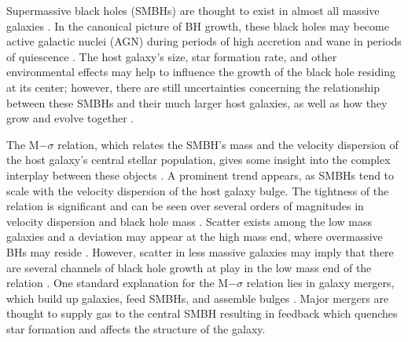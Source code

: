 \documentclass[]{emulateapj}
\begin{document}
Supermassive black holes (SMBHs) are thought to exist in almost all massive galaxies \citep[see][for a review]{Kormendy2013}. In the canonical picture of BH growth, these black holes may become active galactic nuclei (AGN) during periods of high accretion and wane in periods of quiescence \citep{Alexander2005,Papovich2006,Volonteri2012}. The host galaxy's size, star formation rate, and other environmental effects may help to influence the growth of the black hole residing at its center; however, there are still uncertainties concerning the relationship between these SMBHs and their much larger host galaxies, as well as how they grow and evolve together \citep{Haehnelt2000,DiMatteo2005,Hopkins2006,Fu2008,Sijacki2009,Silverman2009,Mullaney2012}.

The M$-\sigma$ relation, which relates the SMBH's mass and the velocity dispersion of the host galaxy's central stellar population, gives some insight into the complex interplay between these objects \citep{Ferrarese2000}. A prominent trend appears, as SMBHs tend to scale with the velocity dispersion of the host galaxy bulge. The tightness of the relation is significant and can be seen over several orders of magnitudes in velocity dispersion and black hole mass \citep[e.g.][]{Merritt2001,Graham2011,Mcconnell2013,Kormendy2013}. Scatter exists among the low mass galaxies and a deviation may appear at the high mass end, where overmassive BHs may reside \citep{VanDenBosch2007,Moster2010,Natarajan2011}. However, scatter in less massive galaxies may imply that there are several channels of black hole growth at play in the low mass end of the relation \citep{Micic2007,Volonteri2009,Reines2013,Graham2014}. One standard explanation for the M$-\sigma$ relation lies in galaxy mergers, which build up galaxies, feed SMBHs, and assemble bulges \citep[e.g.][]{DiMatteo2005,Shen2008}. Major mergers are thought to supply gas to the central SMBH resulting in feedback which quenches star formation and affects the structure of the galaxy. 


\end{document}
